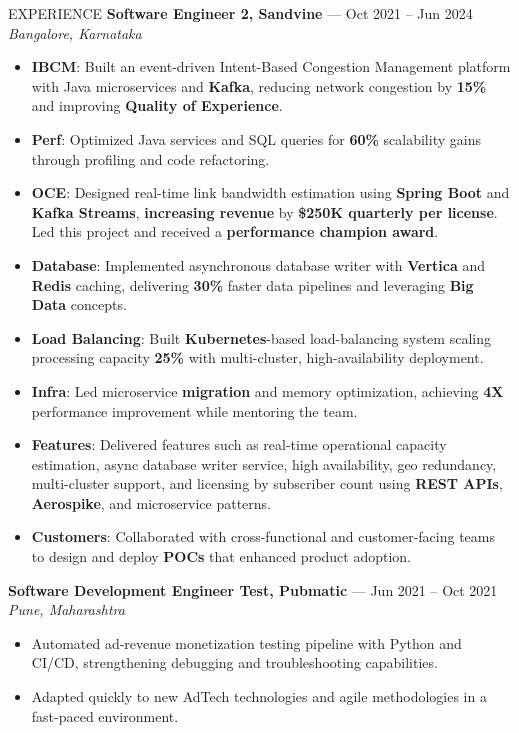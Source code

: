 \documentclass{resume} %
\begin{document}
\begin{rSection}{EXPERIENCE}
\textbf{Software Engineer 2, Sandvine} --- Oct 2021 -- Jun 2024\\
\textit{Bangalore, Karnataka}\\
 \begin{itemize}
    \itemsep -6pt 
     \item \textbf{IBCM}: Built an event-driven Intent-Based Congestion Management platform with Java microservices and \textbf{Kafka}, reducing network congestion by \textbf{15\%} and improving \textbf{Quality of Experience}.
    \item \textbf{Perf}: Optimized Java services and SQL queries for \textbf{60\%} scalability gains through profiling and code refactoring.
    \item \textbf{OCE}: Designed real-time link bandwidth estimation using \textbf{Spring Boot} and \textbf{Kafka Streams}, \textbf{increasing revenue} by \textbf{\$250K quarterly per license}. Led this project and received a \textbf{performance champion award}.
    \item \textbf{Database}: Implemented asynchronous database writer with \textbf{Vertica} and \textbf{Redis} caching, delivering \textbf{30\%} faster data pipelines and leveraging \textbf{Big Data} concepts.
    \item \textbf{Load Balancing}: Built \textbf{Kubernetes}-based load-balancing system scaling processing capacity \textbf{25\%} with multi-cluster, high-availability deployment.
    \item \textbf{Infra}: Led microservice \textbf{migration} and memory optimization, achieving \textbf{4X} performance improvement while mentoring the team.
    \item \textbf{Features}: Delivered features such as real-time operational capacity estimation, async database writer service, high availability, geo redundancy, multi-cluster support, and licensing by subscriber count using \textbf{REST APIs}, \textbf{Aerospike}, and microservice patterns.
    \item \textbf{Customers}: Collaborated with cross-functional and customer-facing teams to design and deploy \textbf{POCs} that enhanced product adoption.

 \end{itemize}
 
\textbf{Software Development Engineer Test, Pubmatic} --- Jun 2021 -- Oct 2021\\
\textit{Pune, Maharashtra}\\
 \begin{itemize}
    \itemsep -6pt 
     \item Automated ad-revenue monetization testing pipeline with Python and CI/CD, strengthening debugging and troubleshooting capabilities.
    \item Adapted quickly to new AdTech technologies and agile methodologies in a fast-paced environment.
 \end{itemize}
\end{rSection} 
\end{document}
